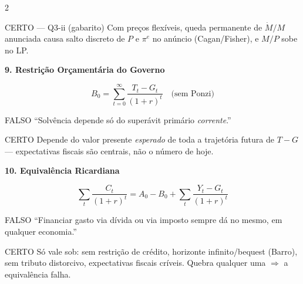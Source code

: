 \documentclass[10pt, a4paper]{article}
\begin{document}
\begin{multicols}{2}
\begin{certobox}{CERTO --- Q3-ii (gabarito)}
Com preços flexíveis, queda permanente de $\dot M/M$ anunciada causa salto
discreto de $P$ e $\pi^e$ no anúncio (Cagan/Fisher), e $M/P$ sobe no LP.
\end{certobox}

\vspace{0.5em}
\textbf{\color{azul}\large 9. Restrição Orçamentária do Governo}

\begin{formulabox}
\[B_0 = \sum_{t=0}^{\infty}\frac{T_t-G_t}{(1+r)^t} \quad\text{(sem Ponzi)}\]
\end{formulabox}

\begin{errobox}{FALSO}
``Solvência depende só do superávit primário \emph{corrente}.''
\end{errobox}
\vspace{0.3em}
\begin{certobox}{CERTO}
Depende do valor presente \emph{esperado} de toda a trajetória futura de
$T-G$ --- expectativas fiscais são centrais, não o número de hoje.
\end{certobox}

\vspace{0.5em}
\textbf{\color{azul}\large 10. Equivalência Ricardiana}

\begin{formulabox}
\[\sum_t \frac{C_t}{(1+r)^t} = A_0-B_0+\sum_t\frac{Y_t-G_t}{(1+r)^t}\]
\end{formulabox}

\begin{errobox}{FALSO}
``Financiar gasto via dívida ou via imposto sempre dá no mesmo, em qualquer
economia.''
\end{errobox}
\vspace{0.3em}
\begin{certobox}{CERTO}
Só vale sob: sem restrição de crédito, horizonte infinito/bequest (Barro),
sem tributo distorcivo, expectativas fiscais críveis. Quebra qualquer uma
$\Rightarrow$ a equivalência falha.
\end{certobox}

\end{multicols}
\end{document}

